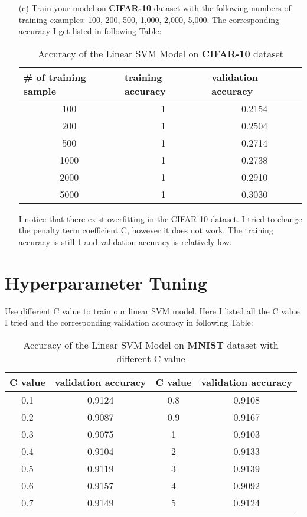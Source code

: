 \documentclass[a4paper,12pt]{article}
\begin{document}
\begin{itemize}
\item[(c)]Train your model on \textbf{CIFAR-10} dataset with the following numbers of training examples: 100, 200, 500, 1,000, 2,000, 5,000. The corresponding accuracy I get listed in following Table:

\begin{table}[htbp]
  \centering
  \caption{Accuracy of the Linear SVM Model on \textbf{CIFAR-10} dataset}
    \begin{tabular}{ccc}
    \multicolumn{1}{l}{\# of training sample} & \multicolumn{1}{l}{training accuracy} & \multicolumn{1}{l}{validation accuracy} \\
    \hline
    100 & 1 & 0.2154 \\
    200 & 1 & 0.2504 \\
    500 & 1 & 0.2714 \\
    1000 & 1 & 0.2738 \\
    2000 & 1 & 0.2910 \\
    5000& 1 & 0.3030\\
    \end{tabular}%
  \label{tab3}%
\end{table}%

I notice that there exist overfitting in the CIFAR-10 dataset. I tried to change the penalty term coefficient C, however it does not work. The training accuracy is still 1 and validation accuracy is relatively low.
\end{itemize}

\clearpage

\section{Hyperparameter Tuning}
Use different C value to train our linear SVM model. Here I listed all the C value I tried and the corresponding validation accuracy in following Table:

\begin{table}[htbp]
  \centering
  \caption{Accuracy of the Linear SVM Model on \textbf{MNIST} dataset with different C value}
    \begin{tabular}{cc|cc}
    \multicolumn{1}{l}{C value} & \multicolumn{1}{l|}{validation accuracy} & \multicolumn{1}{l}{C value} & \multicolumn{1}{l}{validation accuracy}\\
    \hline
    0.1 & 0.9124 &    0.8 & 0.9108 \\
    0.2 & 0.9087 &     0.9 & 0.9167 \\
    0.3 & 0.9075 &     1 & 0.9103 \\
    0.4 & 0.9104 &    2 & 0.9133 \\
    0.5 & 0.9119 &    3 & 0.9139 \\
    0.6 & 0.9157 &    4 & 0.9092 \\
    0.7 & 0.9149 &     5 & 0.9124 \\
    \end{tabular}%
  \label{tab4}%
\end{table}%
\end{document}
